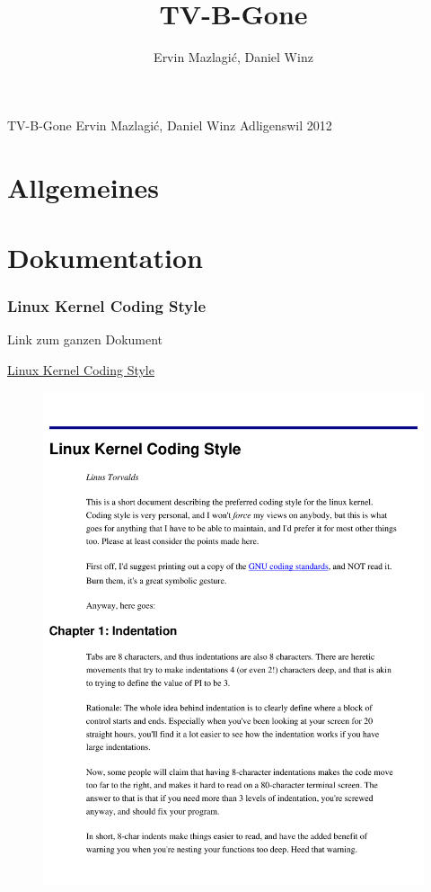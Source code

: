 \documentclass[a4paper,
               10pt,
               fleqn]{article}
\author{Ervin Mazlagi\'c, Daniel Winz}
\title{TV-B-Gone}
\begin{document}
         {TV-B-Gone}
         {Ervin Mazlagi\'c, Daniel Winz}
         {Adligenswil}
         {2012}

\tableofcontents
\newpage



\part{Allgemeines}



\part{Dokumentation}



\begin{appendix}
    \clearpage
    \newpage

    \section{Linux Kernel Coding Style}
    Link zum ganzen Dokument 

    \href{https://computing.llnl.gov/linux/slurm/coding_style.pdf}{
        Linux Kernel Coding Style}
    \begin{figure}[h!]
    \includegraphics[page=1, width=1\textwidth]{kernelstyle.pdf}
    \end{figure}
    \newpage


\end{appendix}
\end{document}
